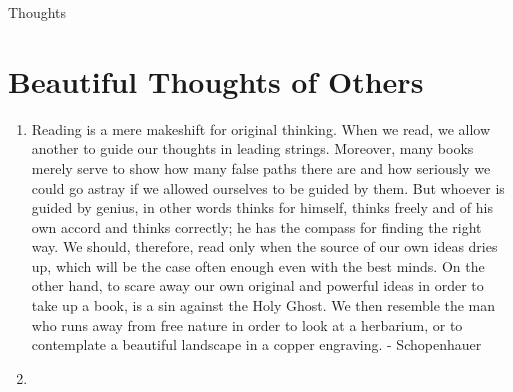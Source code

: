 \documentclass{article}
\begin{document}
Thoughts
\section*{Beautiful Thoughts of Others}
\begin{enumerate}
\item Reading is a mere makeshift for original thinking. When we read, we allow another to guide our thoughts in leading strings. Moreover, many books merely serve to show how many false paths there are and how seriously we could go
astray if we allowed ourselves to be guided by them. But whoever is guided by
genius, in other words thinks for himself, thinks freely and of his own accord and thinks correctly; he has the compass for finding the right way. We should,
therefore, read only when the source of our own ideas dries up, which will be the case often enough even with the best minds. On the other hand, to scare away our own original and powerful ideas in order to take up a book, is a sin against the Holy Ghost. We then resemble the man who runs away from free nature in order
to look at a herbarium, or to contemplate a beautiful landscape in a copper
engraving. - Schopenhauer
\item 
\end{enumerate}
\end{document}
